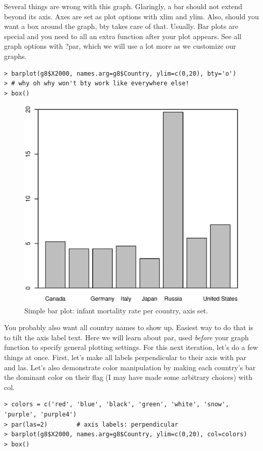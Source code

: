 \documentclass{report}
\newcommand{\code}[1]{\textsf{\ttfamily #1}}
\begin{document}
	Several things are wrong with this graph. Glaringly, a bar should not extend beyond its axis. Axes are set as plot options with \code{xlim} and \code{ylim}. Also, should you want a box around the graph, \code{bty} takes care of that. Usually. Bar plots are special and you need to all an extra function after your plot appears. See all graph options with \code{?par}, which we will use a lot more as we customize our graphs.
	\begin{verbatim}
> barplot(g8$X2000, names.arg=g8$Country, ylim=c(0,20), bty='o')	
> # why oh why won't bty work like everywhere else!
> box()
	\end{verbatim}
	\begin{figure}[h]
		\centering
		\includegraphics[width=1.0\textwidth]{baraxis.eps}
		\caption{Simple bar plot: infant mortality rate per country, axis set.}
		\label{fig:baraxis}
	\end{figure}

	You probably also want all country names to show up. Easiest way to do that is to tilt the axis label text. Here we will learn about \code{par}, used \emph{before} your graph function to specify general plotting settings. For this next iteration, let's do a few things at once. First, let's make all labels perpendicular to their axis with \code{par} and \code{las}. Let's also demonstrate color manipulation by making each country's bar the dominant color on their flag (I may have made some arbitrary choices) with \code{col}.
	\begin{verbatim}
> colors = c('red', 'blue', 'black', 'green', 'white', 'snow', 'purple', 'purple4')
> par(las=2)		# axis labels: perpendicular
> barplot(g8$X2000, names.arg=g8$Country, ylim=c(0,20), col=colors)
> box()
	\end{verbatim}
\end{document}
